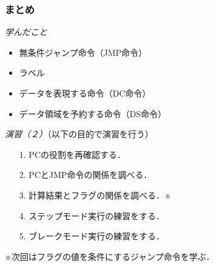 \documentclass{beamer}                 %
\begin{document}
\begin{frame}
  \frametitle{まとめ}
  \emph{学んだこと}
  \begin{itemize}
  \item 無条件ジャンプ命令（JMP命令）
  \item ラベル
  \item データを表現する命令（DC命令）
  \item データ領域を予約する命令（DS命令）
  \end{itemize}
  \vfill

  \emph{演習（２）}（以下の目的で演習を行う）
  \begin{enumerate}
  \item[1.] PCの役割を再確認する．
  \item[2.] PCとJMP命令の関係を調べる．
  \item[3.] 計算結果とフラグの関係を調べる．※
  \item[4.] ステップモード実行の練習をする．
  \item[5.] ブレークモード実行の練習をする．
  \end{enumerate}
  \vfill
  ※次回はフラグの値を条件にするジャンプ命令を学ぶ．
  \vfill
\end{frame}

\end{document}
